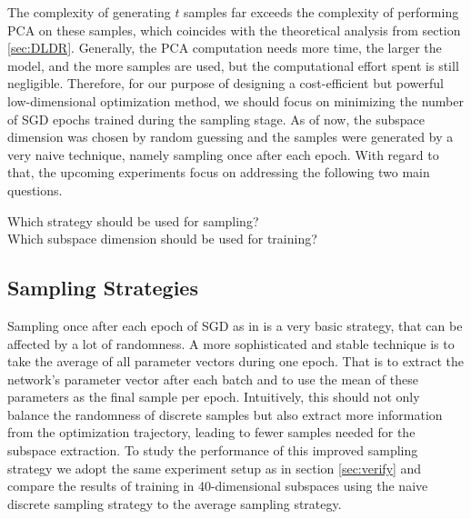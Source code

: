 \documentclass[11pt, a4paper]{article}
\begin{document}
The complexity of generating $t$ samples far exceeds the complexity of performing PCA on these samples, which coincides with the theoretical analysis from section \ref{sec:DLDR}. Generally, the PCA computation needs more time, the larger the model, and the more samples are used, but the computational effort spent is still negligible. Therefore, for our purpose of designing a cost-efficient but powerful low-dimensional optimization method, we should focus on minimizing the number of SGD epochs trained during the sampling stage. As of now, the subspace dimension was chosen by random guessing and the samples were generated by a very naive technique, namely sampling once after each epoch. With regard to that, the upcoming experiments focus on addressing the following two main questions.

\begin{center}
Which strategy should be used for sampling? \\
Which subspace dimension should be used for training?
\end{center}

\subsection{Sampling Strategies}

Sampling once after each epoch of SGD as in \cite{Paper} is a very basic strategy, that can be affected by a lot of randomness. A more sophisticated and stable technique is to take the average of all parameter vectors during one epoch. That is to extract the network's parameter vector after each batch and to use the mean of these parameters as the final sample per epoch. Intuitively, this should not only balance the randomness of discrete samples but also extract more information from the optimization trajectory, leading to fewer samples needed for the subspace extraction. To study the performance of this improved sampling strategy we adopt the same experiment setup as in section \ref{sec:verify} and compare the results of training in 40-dimensional subspaces using the naive discrete sampling strategy to the average sampling strategy. \\
\end{document}

